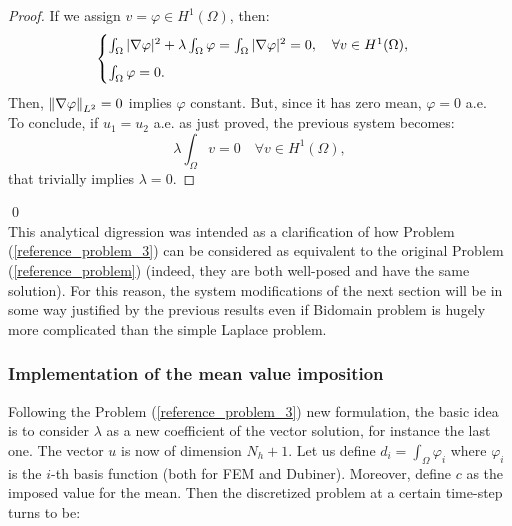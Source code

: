 \documentclass[a4paper,11pt]{article}
\begin{document}
\begin{proof}
	\noindent If we assign $v=\varphi \in H^1(\Omega)$, then:
	\begin{equation*}
	\begin{cases}
	\int_{\Omega}|\nabla \varphi|^2 + \lambda \int_\Omega \varphi = \int_{\Omega}|\nabla \varphi|^2 = 0, \quad \forall v \in H^1(\Omega),\vspace{2mm} \\
	\int_{\Omega}\varphi = 0.
	\end{cases}
	\end{equation*}
	Then, $\norm{\nabla \varphi}_{L^2} = 0 $ implies $\varphi$ constant. But, since it has zero mean,  $\varphi = 0$ a.e.  \\
	To conclude, if $u_1=u_2$ a.e. as just proved, the previous system becomes:
	\begin{equation*}
	\lambda \int_{\Omega}v = 0 \quad \forall v \in H^1(\Omega),
	\end{equation*}
	that trivially implies $\lambda=0$.	
\end{proof}
	\qed
	\vspace{3mm} \\
	\noindent This analytical digression was intended as a clarification of how Problem (\ref{reference_problem_3}) can be considered as equivalent to the original Problem (\ref{reference_problem}) (indeed, they are both well-posed and have the same solution). For this reason, the system modifications of the next section will be in some way justified by the previous results even if Bidomain problem is hugely more complicated than the simple Laplace problem.


\subsubsection{Implementation of the mean value imposition} \label{mean_value_implementation}
\noindent Following the Problem (\ref{reference_problem_3}) new formulation, the basic idea is to consider $\lambda$ as a new coefficient of the vector solution, for instance the last one. The vector $u$ is now of dimension $N_h+1$. Let us define $d_i=\int_\Omega \varphi_i$ where $\varphi_i$ is the $i$-th basis function (both for FEM and Dubiner). Moreover, define $c$ as the imposed value for the mean. Then the discretized problem at a certain time-step turns to be:
\end{document}
